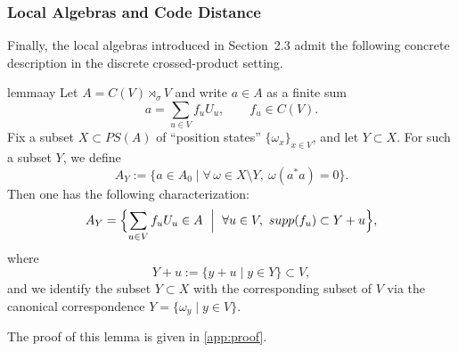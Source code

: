 \documentclass[12pt]{article}
\theoremstyle{definition} %
\theoremstyle{plain} %
\theoremstyle{remark} %
\theoremstyle{underline}
\begin{document}
\subsubsection*{Local Algebras and Code Distance}

Finally, the local algebras introduced in Section~2.3 admit the following concrete description in the discrete crossed-product setting.

\begin{restatable}{lemma}{ay}
    \label{lem:AY-support}
    Let $A=C(V)\rtimes_\sigma V$ and write $a\in A$ as a finite sum
    \[
        a=\sum_{u\in V} f_u U_u, \qquad f_u\in C(V).
    \]
    Fix a subset $X\subset PS(A)$ of ``position states'' $\{\omega_x\}_{x\in V}$, and let $Y\subset X$.
    For such a subset $Y$, we define
    \[
        A_Y:=\{a\in A_0\mid \forall\,\omega\in X\setminus Y,\ \omega(a^*a)=0\}.
    \]
    Then one has the following characterization:
    \[
        A_Y=\Bigl\{\sum_{u\in V} f_uU_u\in A \ \Bigm|\ \forall u\in V,\ supp(f_u)\subset Y+u\Bigr\}, 
    \]
    where
    \[
        Y+u:=\{y+u\mid y\in Y\}\subset V,
    \]
    and we identify the subset $Y\subset X$ with the corresponding subset of $V$ via the canonical correspondence $Y=\{\omega_y\mid y\in V\}$.
\end{restatable}

The proof of this lemma is given in \ref{app:proof}.




\end{document}
